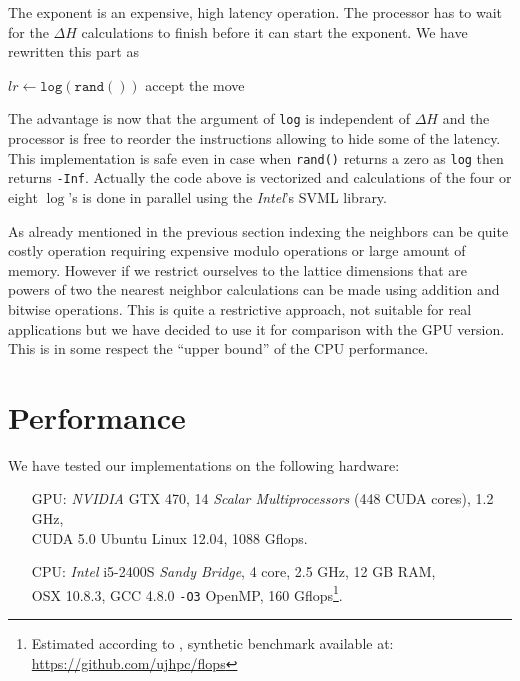 \documentclass[a4paper]{llncs}
\begin{document}
The exponent is an expensive, high latency operation. The processor has to wait
for the $\Delta H$ calculations to finish before it can start the exponent. We
have rewritten this part as

\begin{algorithmic}[1]
  \State $lr \gets \mathtt{log}(\mathtt{rand}())$
    \State accept the move
  \EndIf
\EndFor
\end{algorithmic}

The advantage is now that the argument of \texttt{log} is independent of
$\Delta H$ and the processor is free to reorder the instructions allowing to
hide some of the latency. This implementation is safe even in case when
\texttt{rand()} returns a zero as \texttt{log} then returns \texttt{-Inf}.
Actually the code above is vectorized and calculations of the four or eight
$\log$'s is done in parallel using the \emph{Intel}'s SVML library\cite{svml}.

As already mentioned in the previous section indexing the neighbors can be
quite costly operation requiring expensive modulo operations or large amount of
memory. However if we restrict ourselves to the lattice dimensions that are
powers of two the nearest neighbor calculations can be made using addition and
bitwise operations. This is quite a restrictive approach, not suitable for real
applications but we have decided to use it for comparison with the GPU version.
This is in some respect the ``upper bound'' of the CPU performance.


\section{Performance}
\label{sec:performance}

We have tested our implementations on the following hardware:
\begin{itemize}

\item[GPU:] \emph{NVIDIA} GTX 470, 14 \emph{Scalar Multiprocessors} (448 CUDA
cores), 1.2 GHz, \\ CUDA 5.0 Ubuntu Linux 12.04, 1088 Gflops.

\vspace{.5em}

\item[CPU:] \emph{Intel} i5-2400S \emph{Sandy Bridge}, 4 core, 2.5 GHz, 12 GB
RAM, \\ OSX 10.8.3, GCC 4.8.0 \verb!-O3! OpenMP, 160 Gflops\footnote{Estimated
according to \cite{intel}, synthetic benchmark available at: \\
\url{https://github.com/ujhpc/flops}}.

\end{itemize}
\end{document}
